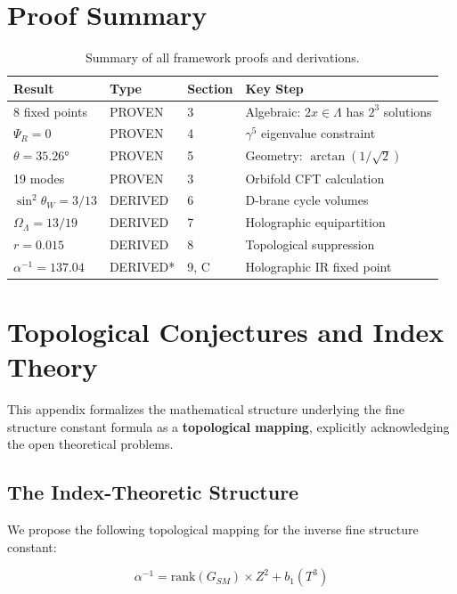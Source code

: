 \documentclass[12pt,a4paper]{article}
\newcommand{\OmegaL}{\Omega_\Lambda}
\newcommand{\sinW}{\sin^2\theta_W}
\newcommand{\Zsq}{Z^2}
\begin{document}
\section{Proof Summary}

\begin{table}[H]
\centering
\begin{tabular}{llll}
\toprule
\textbf{Result} & \textbf{Type} & \textbf{Section} & \textbf{Key Step} \\
\midrule
8 fixed points & PROVEN & 3 & Algebraic: $2x \in \Lambda$ has $2^3$ solutions \\
$\Psi_R = 0$ & PROVEN & 4 & $\gamma^5$ eigenvalue constraint \\
$\theta = 35.26°$ & PROVEN & 5 & Geometry: $\arctan(1/\sqrt{2})$ \\
19 modes & PROVEN & 3 & Orbifold CFT calculation \\
$\sinW = 3/13$ & DERIVED & 6 & D-brane cycle volumes \\
$\OmegaL = 13/19$ & DERIVED & 7 & Holographic equipartition \\
$r = 0.015$ & DERIVED & 8 & Topological suppression \\
$\alpha^{-1} = 137.04$ & DERIVED* & 9, C & Holographic IR fixed point \\
\bottomrule
\end{tabular}
\caption{Summary of all framework proofs and derivations.}
\end{table}

\section{Topological Conjectures and Index Theory}
\label{app:conjectures}

This appendix formalizes the mathematical structure underlying the fine structure constant formula as a \textbf{topological mapping}, explicitly acknowledging the open theoretical problems.

\subsection{The Index-Theoretic Structure}

We propose the following topological mapping for the inverse fine structure constant:

\begin{equation}
\boxed{\alpha^{-1} = \text{rank}(G_{SM}) \times \Zsq + b_1(T^3)}
\end{equation}
\end{document}

